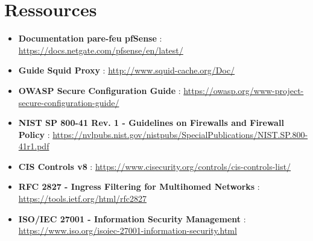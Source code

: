 \newpage

\section*{Ressources}

\begin{itemize}
  \item \textbf{Documentation pare-feu pfSense} : \url{https://docs.netgate.com/pfsense/en/latest/}
  \item \textbf{Guide Squid Proxy} : \url{http://www.squid-cache.org/Doc/}
  \item \textbf{OWASP Secure Configuration Guide} : \url{https://owasp.org/www-project-secure-configuration-guide/}
  \item \textbf{NIST SP 800-41 Rev. 1 - Guidelines on Firewalls and Firewall Policy} : \url{https://nvlpubs.nist.gov/nistpubs/SpecialPublications/NIST.SP.800-41r1.pdf}
  \item \textbf{CIS Controls v8} : \url{https://www.cisecurity.org/controls/cis-controls-list/}
  \item \textbf{RFC 2827 - Ingress Filtering for Multihomed Networks} : \url{https://tools.ietf.org/html/rfc2827}
  \item \textbf{ISO/IEC 27001 - Information Security Management} : \url{https://www.iso.org/isoiec-27001-information-security.html}
\end{itemize}